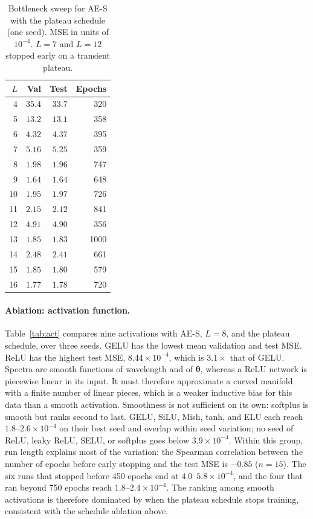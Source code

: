 \begin{table}[t]
  \centering
  \caption{Bottleneck sweep for AE-S with the plateau schedule (one seed). MSE in units of $10^{-4}$. $L=7$ and $L=12$ stopped early on a transient plateau.}
  \label{tab:latent}
  \begin{tabular}{rrrr}
    \toprule
    $L$ & Val & Test & Epochs \\
    \midrule
    4  & $35.4$ & $33.7$ & 320 \\
    5  & $13.2$ & $13.1$ & 358 \\
    6  & $4.32$ & $4.37$ & 395 \\
    7  & $5.16$ & $5.25$ & 359 \\
    8  & $1.98$ & $1.96$ & 747 \\
    9  & $\mathbf{1.64}$ & $\mathbf{1.64}$ & 648 \\
    10 & $1.95$ & $1.97$ & 726 \\
    11 & $2.15$ & $2.12$ & 841 \\
    12 & $4.91$ & $4.90$ & 356 \\
    13 & $1.85$ & $1.83$ & 1000 \\
    14 & $2.48$ & $2.41$ & 661 \\
    15 & $1.85$ & $1.80$ & 579 \\
    16 & \underline{$1.77$} & \underline{$1.78$} & 720 \\
    \bottomrule
  \end{tabular}
\end{table}

\paragraph{Ablation: activation function.}
Table~\ref{tab:act} compares nine activations with AE-S, $L=8$, and the plateau schedule, over three seeds.
GELU has the lowest mean validation and test MSE.
ReLU has the highest test MSE, $8.44\times10^{-4}$, which is $3.1\times$ that of GELU.
Spectra are smooth functions of wavelength and of $\bm{\theta}$, whereas a ReLU network is piecewise linear in its input.
It must therefore approximate a curved manifold with a finite number of linear pieces, which is a weaker inductive bias for this data than a smooth activation.
Smoothness is not sufficient on its own: softplus is smooth but ranks second to last.
GELU, SiLU, Mish, tanh, and ELU each reach $1.8$--$2.6\times10^{-4}$ on their best seed and overlap within seed variation; no seed of ReLU, leaky ReLU, SELU, or softplus goes below $3.9\times10^{-4}$.
Within this group, run length explains most of the variation: the Spearman correlation between the number of epochs before early stopping and the test MSE is $-0.85$ ($n=15$).
The six runs that stopped before 450 epochs end at $4.0$--$5.8\times10^{-4}$, and the four that ran beyond 750 epochs reach $1.8$--$2.4\times10^{-4}$.
The ranking among smooth activations is therefore dominated by when the plateau schedule stops training, consistent with the schedule ablation above.

